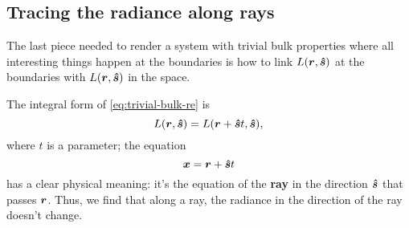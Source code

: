 \documentclass[hyperref, a4paper]{article}
\newcommand*{\concept}[1]{{\textbf{#1}}}
\begin{document}
\subsection{Tracing the radiance along rays}

The last piece needed to render a system with trivial bulk properties 
where all interesting things happen at the boundaries 
is how to link $L(\vb*{r}, \vu*{s})$ at the boundaries 
with $L(\vb*{r}, \vu*{s})$ in the space. 

The integral form of \eqref{eq:trivial-bulk-re} is 
\begin{equation}
    L(\vb*{r}, \vu*{s}) = L(\vb*{r} + \vu*{s} t , \vu*{s}),
    \label{eq:intensity-invariance}
\end{equation}
where $t$ is a parameter; the equation 
\begin{equation}
    \vb*{x} = \vb*{r} + \vu*{s} t 
\end{equation}
has a clear physical meaning: it's the equation of the \concept{ray} 
in the direction $\vu*{s}$ that passes $\vb*{r}$.
Thus, we find that along a ray, 
the radiance in the direction of the ray doesn't change. 
\end{document}
